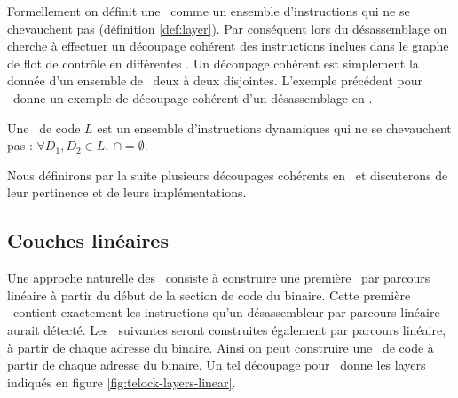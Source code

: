 
Formellement on définit une \layer\ comme un ensemble d'instructions qui ne se chevauchent pas (définition \ref{def:layer}).
Par conséquent lors du désassemblage on cherche à effectuer un découpage cohérent des instructions inclues dans le graphe de flot de contrôle en différentes \layers. Un découpage cohérent est simplement la donnée d'un ensemble de \layers\ deux à deux disjointes.
L'exemple précédent pour \telock\ donne un exemple de découpage cohérent d'un désassemblage en \layers.

\begin{defi}
 Une \layer\ de code $L$ est un ensemble d'instructions dynamiques qui ne se chevauchent pas : $\forall D_1, D_2\in L,\ $$\cap$$=\emptyset$.
\label{def:layer}
\end{defi}

Nous définirons par la suite plusieurs découpages cohérents en \layers\ et discuterons de leur pertinence et de leurs implémentations.

\subsection{Couches linéaires}

Une approche naturelle des \layers\ consiste à construire une première \layer\ par parcours linéaire à partir du début de la section de code du binaire.
Cette première \layer\ contient exactement les instructions qu'un désassembleur par parcours linéaire aurait détecté.
Les \layers\ suivantes seront construites également par parcours linéaire, à partir de chaque adresse du binaire.
Ainsi on peut construire une \layer\ de code à partir de chaque adresse du binaire.
Un tel découpage pour \telock\ donne les layers indiqués en figure \ref{fig:telock-layers-linear}.

